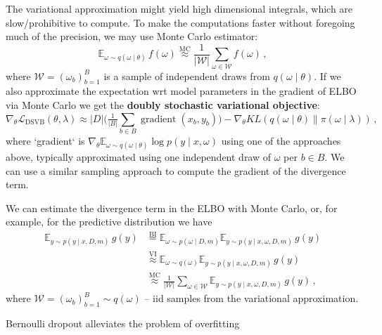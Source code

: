\documentclass[a4paper,10pt]{article}
\begin{document}
The variational approximation might yield high dimensional integrals, which are slow/prohibitive
to compute. To make the computations faster without foregoing much of the precision, we may use
Monte Carlo estimator:
$$
\mathbb{E}_{\omega \sim q(\omega\mid \theta)} \, f(\omega)
  \overset{\text{MC}}{\approx}
    \frac1{\lvert \mathcal{W}\rvert}
      \sum_{\omega \in \mathcal{W}} f(\omega)
  \,, $$
where $\mathcal{W} = (\omega_b)_{b=1}^B$ is a sample of independent draws from $
  q(\omega\mid \theta)
$. If we also approximate the expectation wrt model parameters in the gradient of ELBO via Monte
Carlo we get the \textbf{doubly stochastic variational objective}:
$$
\nabla_\theta \mathcal{L}_\mathrm{DSVB}(\theta, \lambda)
  \approx
    \lvert D \rvert \biggl(
      \tfrac1{\lvert B \rvert}
        \sum_{b \in B}
          \mathop{gradient}(x_b, y_b)
    \biggr)
    - \nabla_\theta KL(q(\omega \mid \theta) \| \pi(\omega \mid \lambda))
  \,, $$
where `gradient` is $
  \nabla_\theta
    \mathbb{E}_{\omega \sim q(\omega \mid \theta)}
      \log p(y \mid x, \omega)
$ using one of the approaches above, typically approximated using one independent draw of $\omega$
per $b\in B$. We can use a similar sampling approach to compute the gradient of the divergence term.

We can estimate the divergence term in the ELBO with Monte Carlo, or, for example, for the
predictive distribution we have
\begin{align}
\mathbb{E}_{y\sim p(y\mid x, D, m)} \, g(y)
  &
  \overset{\text{BI}}{=}
    \mathbb{E}_{\omega\sim p(\omega \mid D, m)}
      \mathbb{E}_{y\sim p(y\mid x, \omega, D, m)} \, g(y)
  \\
  &
  \overset{\text{VI}}{\approx}
    \mathbb{E}_{\omega\sim q(\omega)}
      \mathbb{E}_{y\sim p(y\mid x, \omega, D, m)} \, g(y)
  \\
  &
  \overset{\text{MC}}{\approx}
    \frac1{\lvert \mathcal{W}\rvert} \sum_{\omega \in \mathcal{W}}
      \mathbb{E}_{y\sim p(y\mid x, \omega, D, m)} \, g(y)
  \,,
\end{align}
where $\mathcal{W} = (\omega_b)_{b=1}^B \sim q(\omega)$ -- iid samples from the variational
approximation.

\bigskip

Bernoulli dropout alleviates the problem of overfitting

\end{document}
